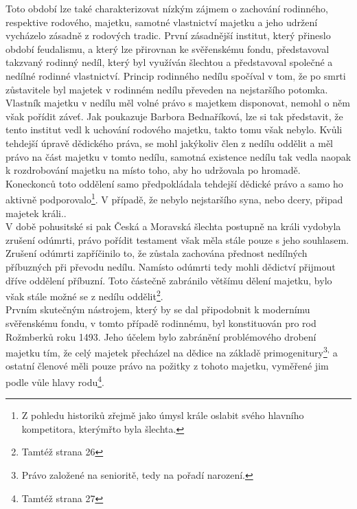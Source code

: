 \documentclass{article}
\begin{document}
Toto období lze také charakterizovat nízkým zájmem o zachování rodinného, respektive rodového, majetku, samotné vlastnictví majetku a jeho udržení vycházelo zásadně z rodových tradic. První zásadnější institut, který přineslo období feudalismu, a který lze přirovnan ke svěřenskému fondu, představoval takzvaný rodinný nedíl, který byl využíván šlechtou a představoval společné a nedílné rodinné vlastnictví. Princip rodinného nedílu spočíval v tom, že po smrti zůstavitele byl majetek v rodinném nedílu převeden na nejstaršího potomka. Vlastník majetku v nedílu měl volné právo s majetkem disponovat, nemohl o něm však pořídit záveť. Jak poukazuje Barbora Bednaříková, lze si tak představit, že tento institut vedl k uchování rodového majetku, takto tomu však nebylo. Kvůli tehdejší úpravě dědického práva, se mohl jakýkoliv člen z nedílu oddělit a měl právo na část majetku v tomto nedílu, samotná existence nedílu tak vedla naopak k rozdrobování majetku na místo toho, aby ho udržovala po hromadě. Koneckonců toto oddělení samo předpokládala tehdejší dědické právo a samo ho aktivně podporovalo\footnote{Z pohledu historiků zřejmě jako úmysl krále oslabit svého hlavního kompetitora, kterýmřto byla šlechta.}. V případě, že nebylo nejstaršího syna, nebo dcery, připad majetek králi..\\

V době pohusitské si pak Česká a Moravská šlechta postupně na králi vydobyla zrušení odúmrti, právo pořídit testament však měla stále pouze s jeho souhlasem. Zrušení odúmrti zapříčinilo to, že zůstala zachována přednost nedílných příbuzných při převodu nedílu. Namísto odúmrti tedy mohli dědictví přijmout dříve oddělení příbuzní. Toto částečně zabránilo většímu dělení majetku, bylo však stále možné se z nedílu oddělit\footnote{Tamtéž strana 26}.\\

Prvním skutečným nástrojem, který by se dal připodobnit k modernímu svěřenskému fondu, v tomto případě rodinnému, byl konstituován pro rod Rožmberků roku 1493. Jeho účelem bylo zabránění problémového drobení majetku tím, že celý majetek přecházel na dědice na základě primogenitury\footnote{Právo založené na senioritě, tedy na pořadí narození.}\textsuperscript{,} a ostatní členové měli pouze právo na požitky z tohoto majetku, vyměřené jim podle vůle hlavy rodu\footnote{Tamtéž strana 27}.\\
\end{document}
